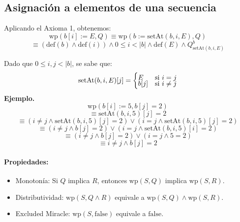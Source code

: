 \documentclass[9pt]{extarticle}  %
\newcommand{\smalltable}{\fontsize{8pt}{10pt}\selectfont}
\begin{document}
\subsection*{\tiny{Asignación a elementos de una secuencia}}
\noindent\smalltable
\vspace{-0.3cm}
Aplicando el Axioma 1, obtenemos:
\[ \text{wp}(b[i] := E, Q) \equiv \text{wp}(b := \text{setAt}(b, i, E), Q) \]
\[ \equiv (\text{def}(b) \land \text{def}(i)) \land 0 \leq i < |b| \land \text{def}(E) \land Q_{\text{setAt}(b,i,E)}^b \]

Dado que \( 0 \leq i, j < |b| \), se sabe que:
\[ \text{setAt}(b, i, E)[j] = 
\begin{cases} 
\vspace{-0.2cm}
E & \text{si } i = j \\
b[j] & \text{si } i \neq j 
\end{cases} 
\]
\textbf{Ejemplo.}
\[ \text{wp}(b[i] := 5, b[j] = 2) \]
\[ \equiv \text{setAt}(b, i, 5)[j] = 2 \]
\[ \equiv (i \neq j \land \text{setAt}(b, i, 5)[j] = 2) \lor (i = j \land \text{setAt}(b, i, 5)[j] = 2) \]
\[ \equiv (i \neq j \land b[j] = 2) \lor (i = j \land \text{setAt}(b, i, 5)[i] = 2) \]
\[ \equiv (i \neq j \land b[j] = 2) \lor (i = j \land 5 = 2) \]
\[ \equiv i \neq j \land b[j] = 2 \]

\vspace{-0.4cm}
\vspace{-0.5cm}
\paragraph*{Propiedades:}
\begin{itemize}
\vspace{-0.32cm}
    \item Monotonía: Si \( Q \) implica \( R \), entonces \( \text{wp}(S, Q) \) implica \( \text{wp}(S, R) \).
    \vspace{-0.32cm}
    \item Distributividad: \( \text{wp}(S, Q \land R) \) equivale a \( \text{wp}(S, Q) \land \text{wp}(S, R) \).
    \vspace{-0.32cm}
    \item Excluded Miracle: \( \text{wp}(S, \text{false}) \) equivale a \( \text{false} \).
\end{itemize}
\vspace{-0.67cm}
\end{document}
